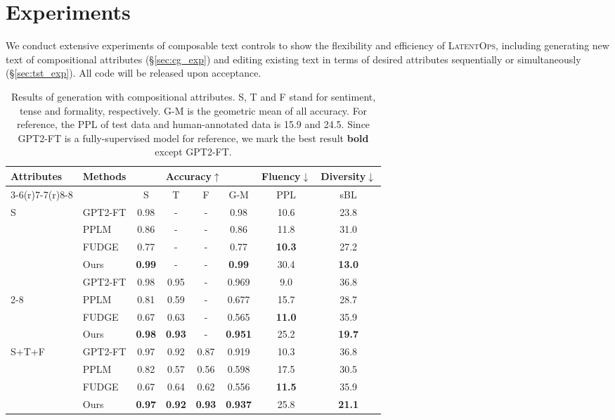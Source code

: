 \documentclass[11pt]{article}
\begin{document}
\section{Experiments}\label{sec:exp}
We conduct extensive experiments of composable text controls to show the flexibility and efficiency of \textsc{LatentOps}, including generating new text of compositional attributes (\S\ref{sec:cg_exp}) and editing existing text in terms of desired attributes sequentially or simultaneously (\S\ref{sec:tst_exp}). 
All code will be released upon acceptance.
\begin{table}[t]
\vspace{-15pt}
\setlength\tabcolsep{3.4pt}
\scriptsize
\centering
\begin{tabular}{llcccccc}
\toprule
\multirow{3}{*}{Attributes} &\multirow{3}{*}{Methods} & \multicolumn{4}{c}{Accuracy$\uparrow$} &  Fluency$\downarrow$ & Diversity$\downarrow$\\\cmidrule(r){3-6}\cmidrule(r){7-7}\cmidrule(r){8-8}
& &S & T & F & G-M &PPL & sBL    \\
\midrule
\multirow{5}{*}{S}
                 & GPT2-FT& 0.98 & -&-&0.98 & 10.6 & 23.8\\\cmidrule{2-8}
                 & PPLM &0.86&-&-&0.86&11.8&31.0 \\
                & FUDGE&0.77&-&-&0.77&\textbf{10.3}&27.2\\
                 & Ours &\textbf{0.99} &-&-&\textbf{0.99} & 30.4 & \textbf{13.0} \\
                 \midrule
\multirow{5}{*}{S+T} 
                 & GPT2-FT   &0.98&0.95&-&0.969&9.0&36.8 \\\cmidrule{2-8}
                 & PPLM&0.81&0.59&-&0.677&15.7&28.7 \\
                & FUDGE&0.67&0.63&-&0.565&\textbf{11.0}&35.9\\
                 & Ours &\textbf{0.98}& \textbf{0.93}& -&\textbf{0.951}& 25.2& \textbf{19.7}\\
                 \midrule
\multirow{5}{*}{S+T+F} 
                 & GPT2-FT  &0.97&0.92&0.87&0.919&10.3&36.8 \\\cmidrule{2-8}
                 & PPLM &0.82&0.57&0.56&0.598&17.5&30.5  \\
                &FUDGE&0.67&0.64&0.62&0.556&\textbf{11.5}&35.9\\
                 & Ours &\textbf{0.97}& \textbf{0.92}& \textbf{0.93}       &\textbf{0.937}   & 25.8            & \textbf{21.1}\\
                 \midrule
\end{tabular}
\caption{Results of generation with compositional attributes. S, T and F stand for sentiment, tense and formality, respectively.  G-M is the geometric mean of all accuracy. 
  For reference, the PPL of test data and human-annotated data is 15.9 and 24.5. Since GPT2-FT is a fully-supervised model for reference, we mark the best result \textbf{bold} except GPT2-FT.
}
\label{tab:multi_cg}
\vspace{-10pt}
\end{table}
\end{document}
